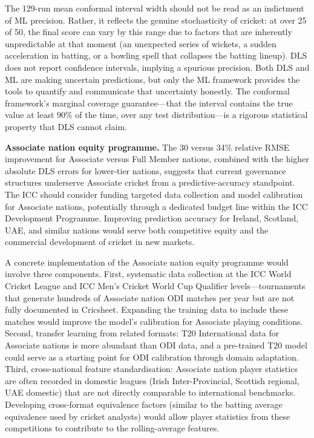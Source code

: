 \documentclass[10pt,a4paper,twocolumn]{article}
\begin{document}
The 129-run mean conformal interval width should not be read as an indictment of ML precision. Rather, it reflects the genuine stochasticity of cricket: at over 25 of 50, the final score can vary by this range due to factors that are inherently unpredictable at that moment (an unexpected series of wickets, a sudden acceleration in batting, or a bowling spell that collapses the batting lineup). DLS does not report confidence intervals, implying a spurious precision. Both DLS and ML are making uncertain predictions, but only the ML framework provides the tools to quantify and communicate that uncertainty honestly. The conformal framework's marginal coverage guarantee---that the interval contains the true value at least 90\% of the time, over any test distribution---is a rigorous statistical property that DLS cannot claim.

\textbf{Associate nation equity programme.} The 30 versus 34\% relative RMSE improvement for Associate versus Full Member nations, combined with the higher absolute DLS errors for lower-tier nations, suggests that current governance structures underserve Associate cricket from a predictive-accuracy standpoint. The ICC should consider funding targeted data collection and model calibration for Associate nations, potentially through a dedicated budget line within the ICC Development Programme. Improving prediction accuracy for Ireland, Scotland, UAE, and similar nations would serve both competitive equity and the commercial development of cricket in new markets.

A concrete implementation of the Associate nation equity programme would involve three components. First, systematic data collection at the ICC World Cricket League and ICC Men's Cricket World Cup Qualifier levels---tournaments that generate hundreds of Associate nation ODI matches per year but are not fully documented in Cricsheet. Expanding the training data to include these matches would improve the model's calibration for Associate playing conditions. Second, transfer learning from related formats: T20 International data for Associate nations is more abundant than ODI data, and a pre-trained T20 model could serve as a starting point for ODI calibration through domain adaptation. Third, cross-national feature standardisation: Associate nation player statistics are often recorded in domestic leagues (Irish Inter-Provincial, Scottish regional, UAE domestic) that are not directly comparable to international benchmarks. Developing cross-format equivalence factors (similar to the batting average equivalence used by cricket analysts) would allow player statistics from these competitions to contribute to the rolling-average features.
\end{document}
